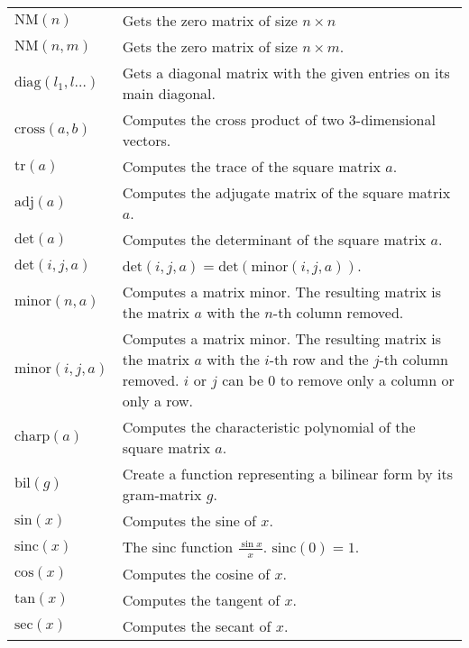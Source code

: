 \documentclass[10pt]{article}
\newcommand{\tabgap}{\vspace{3mm}\\}
\begin{document}
\begin{longtable}{p{}p{}}
        $ \mathrm{NM}(n) $                         & Gets the zero matrix of size $ n\times n $ \\
        $ \mathrm{NM}(n, m) $                      & Gets the zero matrix of size $ n\times m $. \\
        $ \mathrm{diag}(l_1,l\dots) $              & Gets a diagonal matrix with the given entries on its main diagonal. \\
        $ \mathrm{cross}(a, b) $                   & Computes the cross product of two $ 3 $-dimensional vectors. \\
        $ \mathrm{tr}(a) $                         & Computes the trace of the square matrix $ a $. \\
        $ \mathrm{adj}(a) $                        & Computes the adjugate matrix of the square matrix $ a $. \\
        $ \mathrm{det}(a) $                        & Computes the determinant of the square matrix $ a $. \\
        $ \mathrm{det}(i, j, a) $                  & $ \mathrm{det}(i, j, a) = \mathrm{det}(\mathrm{minor}(i, j, a)) $. \\
        $ \mathrm{minor}(n, a) $                   & Computes a matrix minor. The resulting matrix is the matrix $ a $ with the $ n $-th column removed. \\
        $ \mathrm{minor}(i, j, a) $                & Computes a matrix minor. The resulting matrix is the matrix $ a $ with the $ i $-th row and the $ j $-th column removed. $ i $ or $ j $ can be $ 0 $ to remove only a column or only a row. \\
        $ \mathrm{charp}(a) $                      & Computes the characteristic polynomial of the square matrix $ a $. \\
        $ \mathrm{bil}(g) $                        & Create a function representing a bilinear form by its gram-matrix $ g $. \tabgap
        $ \mathrm{sin}(x) $                        & Computes the sine of $ x $. \\
        $ \mathrm{sinc}(x) $                       & The $ \mathrm{sinc} $ function $ \frac{\sin x}{x} $. $ \mathrm{sinc}(0) = 1 $. \\
        $ \mathrm{cos}(x) $                        & Computes the cosine of $ x $. \\
        $ \mathrm{tan}(x) $                        & Computes the tangent of $ x $. \\
        $ \mathrm{sec}(x) $                        & Computes the secant of $ x $. \\

\end{longtable}
\end{document}
